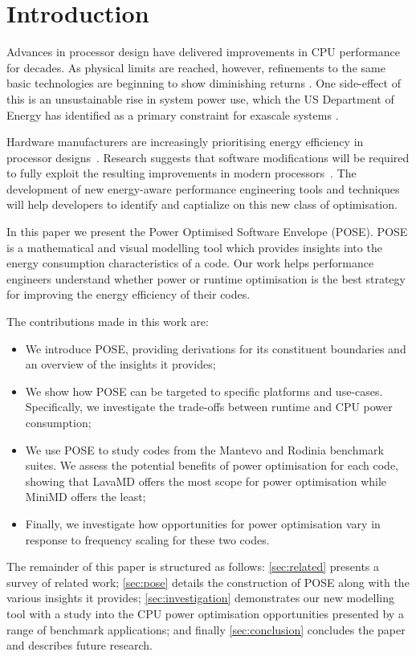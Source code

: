 \section{Introduction} \noindent
Advances in processor design have delivered improvements in CPU performance for decades. As physical limits are reached, however, refinements to the same basic technologies are beginning to show diminishing returns \cite{esmaeilzadeh:2011aa}. 
One side-effect of this is an unsustainable rise in system power use, which the US Department of Energy has identified as a primary constraint for exascale systems \cite{shalf:2011aa}.

Hardware manufacturers are increasingly prioritising energy efficiency in processor designs~\cite{kurd:2014aa}. 
Research suggests that software modifications will be required to fully exploit the resulting improvements in modern processors~\cite{shao:2013aa}.
The development of new energy-aware performance engineering tools and techniques will help developers to identify and captialize on this new class of optimisation.

In this paper we present the Power Optimised Software Envelope (POSE).
POSE is a mathematical and visual modelling tool which provides insights into the energy consumption characteristics of a code.
Our work helps performance engineers understand whether power or runtime optimisation is the best strategy for improving the energy efficiency of their codes.

\noindent
The contributions made in this work are:
\begin{itemize}
  \item We introduce POSE, providing derivations for its constituent boundaries and an overview of the insights it provides;
  \item We show how POSE can be targeted to specific platforms and use-cases. 
        Specifically, we investigate the trade-offs between runtime and CPU power consumption;
  \item We use POSE to study codes from the Mantevo and Rodinia benchmark suites.
        We assess the potential benefits of power optimisation for each code, showing that LavaMD offers the most scope for power optimisation while MiniMD offers the least;
  \item Finally, we investigate how opportunities for power optimisation vary in response to frequency scaling for these two codes.
\end{itemize}

\noindent
The remainder of this paper is structured as follows:
\autoref{sec:related} presents a survey of related work; 
\autoref{sec:pose} details the construction of POSE along with the various insights it provides;
\autoref{sec:investigation} demonstrates our new modelling tool with a study into the CPU power optimisation opportunities presented by a range of benchmark applications;
and finally \autoref{sec:conclusion} concludes the paper and describes future research.
